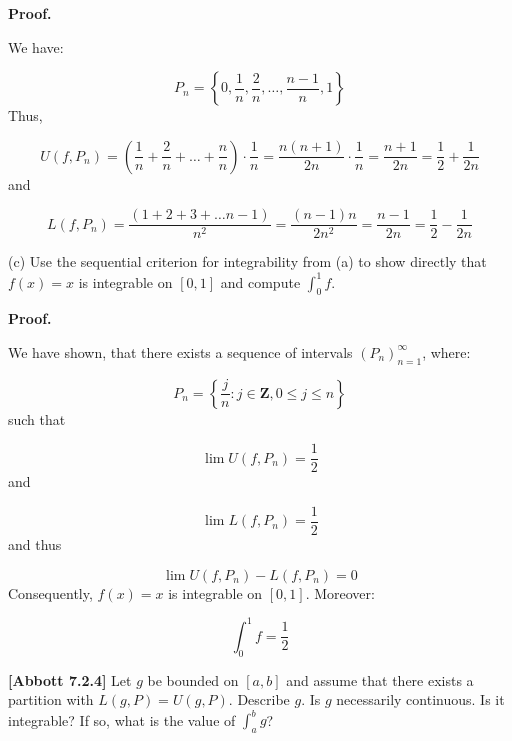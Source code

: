 \documentclass[10pt]{article}
\begin{document}
\textbf{Proof.}



We have:


\begin{equation*}
P_{n} =\left\{0,\frac{1}{n} ,\frac{2}{n} ,\dotsc ,\frac{n-1}{n} ,1\right\}
\end{equation*}
Thus,


\begin{equation*}
U( f,P_{n}) =\left(\frac{1}{n} +\frac{2}{n} +\dotsc +\frac{n}{n}\right) \cdotp \frac{1}{n} =\frac{n( n+1)}{2n} \cdotp \frac{1}{n} =\frac{n+1}{2n} =\frac{1}{2} +\frac{1}{2n}
\end{equation*}
and


\begin{equation*}
L( f,P_{n}) =\frac{( 1+2+3+\dotsc n-1)}{n^{2}} =\frac{( n-1) n}{2n^{2}} =\frac{n-1}{2n} =\frac{1}{2} -\frac{1}{2n}
\end{equation*}


(c) Use the sequential criterion for integrability from (a) to show directly that $\displaystyle f( x) =x$ is integrable on $\displaystyle [ 0,1]$ and compute $\displaystyle \int _{0}^{1} f$. 

\textbf{Proof.}



We have shown, that there exists a sequence of intervals $\displaystyle ( P_{n})_{n=1}^{\infty }$, where:


\begin{equation*}
P_{n} =\left\{\frac{j}{n} :j\in \mathbf{Z} ,0\leq j\leq n\right\}
\end{equation*}
such that 


\begin{equation*}
\lim U( f,P_{n}) =\frac{1}{2}
\end{equation*}
and 


\begin{equation*}
\lim L( f,P_{n}) =\frac{1}{2}
\end{equation*}
and thus 


\begin{equation*}
\lim U( f,P_{n}) -L( f,P_{n}) =0
\end{equation*}
Consequently, $\displaystyle f( x) =x$ is integrable on $\displaystyle [ 0,1]$. Moreover:


\begin{equation*}
\int _{0}^{1} f=\frac{1}{2}
\end{equation*}


\textbf{[Abbott 7.2.4]} Let $\displaystyle g$ be bounded on $\displaystyle [ a,b]$ and assume that there exists a partition with $\displaystyle L( g,P) =U( g,P)$. Describe $\displaystyle g$. Is $\displaystyle g$ necessarily continuous. Is it integrable? If so, what is the value of $\displaystyle \int _{a}^{b} g$?
\end{document}
